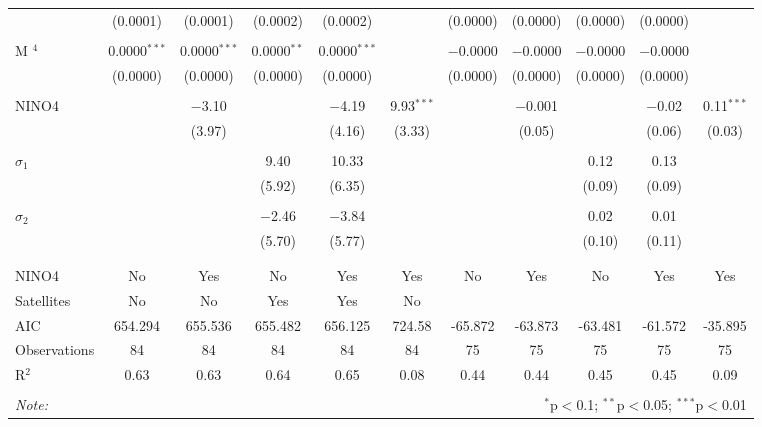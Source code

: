 \documentclass[12pt]{article}
\begin{document}
\begin{landscape}
\begin{table}[H]
\begin{tabular}{@{\extracolsep{0.1pt}}lcccccccccc}
  & (0.0001) & (0.0001) & (0.0002) & (0.0002) &  & (0.0000) & (0.0000) & (0.0000) & (0.0000) &  \\ 
  & & & & & & & & & & \\ 
 M $^4$ & 0.0000$^{***}$ & 0.0000$^{***}$ & 0.0000$^{**}$ & 0.0000$^{***}$ &  & $-$0.0000 & $-$0.0000 & $-$0.0000 & $-$0.0000 &  \\ 
  & (0.0000) & (0.0000) & (0.0000) & (0.0000) &  & (0.0000) & (0.0000) & (0.0000) & (0.0000) &  \\ 
  & & & & & & & & & & \\ 
 NINO4 &  & $-$3.10 &  & $-$4.19 & 9.93$^{***}$ &  & $-$0.001 &  & $-$0.02 & 0.11$^{***}$ \\ 
  &  & (3.97) &  & (4.16) & (3.33) &  & (0.05) &  & (0.06) & (0.03) \\ 
  & & & & & & & & & & \\ 
 $\sigma_1$ &  &  & 9.40 & 10.33 &  &  &  & 0.12 & 0.13 &  \\ 
  &  &  & (5.92) & (6.35) &  &  &  & (0.09) & (0.09) &  \\ 
  & & & & & & & & & & \\ 
 $\sigma_2$ &  &  & $-$2.46 & $-$3.84 &  &  &  & 0.02 & 0.01 &  \\ 
  &  &  & (5.70) & (5.77) &  &  &  & (0.10) & (0.11) &  \\ 
  & & & & & & & & & & \\ 
\hline \\[-1.8ex] 
NINO4 & No & Yes & No & Yes & Yes & No & Yes & No & Yes & Yes \\ 
Satellites & No & No & Yes & Yes & No &  &  &  &  &  \\ 
AIC & 654.294 & 655.536 & 655.482 & 656.125 & 724.58 & -65.872 & -63.873 & -63.481 & -61.572 & -35.895 \\ 
Observations & 84 & 84 & 84 & 84 & 84 & 75 & 75 & 75 & 75 & 75 \\ 
R$^{2}$ & 0.63 & 0.63 & 0.64 & 0.65 & 0.08 & 0.44 & 0.44 & 0.45 & 0.45 & 0.09 \\ 
\hline 
\hline \\[-1.8ex] 
\textit{Note:}  & \multicolumn{10}{r}{$^{*}$p$<$0.1; $^{**}$p$<$0.05; $^{***}$p$<$0.01} \\ 
\end{tabular} 
\end{table} 
\end{landscape}
\end{document}
